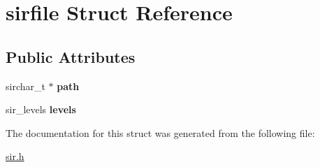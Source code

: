 \hypertarget{structsirfile}{}\section{sirfile Struct Reference}
\label{structsirfile}
\subsection*{Public Attributes}
\begin{DoxyCompactItemize}
\item 
sirchar\+\_\+t $\ast$ {\bfseries path}\hypertarget{structsirfile_a9f4b5f85f13a12175ebcced6820f4257}{}\label{structsirfile_a9f4b5f85f13a12175ebcced6820f4257}

\item 
sir\+\_\+levels {\bfseries levels}\hypertarget{structsirfile_a3485c3a00fd97bb826277b43380fff88}{}\label{structsirfile_a3485c3a00fd97bb826277b43380fff88}

\end{DoxyCompactItemize}


The documentation for this struct was generated from the following file\+:\begin{DoxyCompactItemize}
\item 
\hyperlink{sir_8h}{sir.\+h}\end{DoxyCompactItemize}
